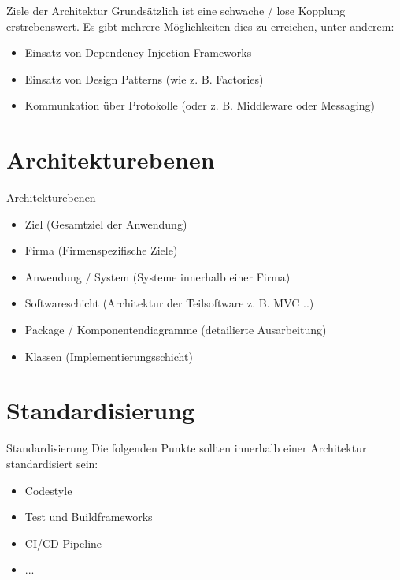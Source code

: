 \documentclass{beamer}
\begin{document}
\begin{frame}{Ziele der Architektur}
	Grundsätzlich ist eine schwache / lose Kopplung erstrebenswert.
	Es gibt mehrere Möglichkeiten dies zu erreichen, unter anderem:

	\begin{itemize}
		\item{Einsatz von Dependency Injection Frameworks}
		\item{Einsatz von Design Patterns (wie z. B. Factories)}
		\item{Kommunkation über Protokolle (oder z. B. Middleware oder
			Messaging)}
	\end{itemize}
\end{frame}

\section{Architekturebenen}

\begin{frame}{Architekturebenen}
	\begin{itemize}
		\item{Ziel (Gesamtziel der Anwendung)}
		\item{Firma (Firmenspezifische Ziele)}
		\item{Anwendung / System (Systeme innerhalb einer Firma)}
		\item{Softwareschicht (Architektur der Teilsoftware z. B. MVC ..)}
		\item{Package / Komponentendiagramme (detailierte Ausarbeitung)}
		\item{Klassen (Implementierungsschicht)}
	\end{itemize}
\end{frame}

\section{Standardisierung}

\begin{frame}{Standardisierung}
	Die folgenden Punkte sollten innerhalb einer Architektur standardisiert sein:

	\begin{itemize}
		\item Codestyle
		\item Test und Buildframeworks
		\item CI/CD Pipeline
		\item ...
	\end{itemize}
\end{frame}
\end{document}
